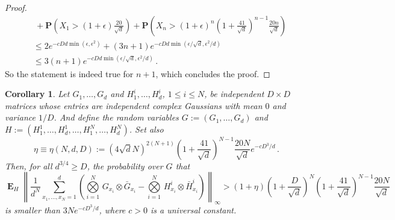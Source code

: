 \documentclass{amsart}
\newtheorem{corollary}[theorem]{Corollary}
\renewcommand{\P}{\mathbf{P}}
\renewcommand{\leq}{\leqslant}
\renewcommand{\geq}{\geqslant}
\DeclareMathOperator{\E}{\mathbf{E}}
\begin{document}
\begin{proof}
\begin{align*}
                                                                                                                     & \ + \P \left( X_1 > (1+\epsilon)\frac{20}{\sqrt{d}} \right) + \P \left( X_n > (1+\epsilon)^n\left(1+\frac{41}{\sqrt{d}}\right)^{n-1}\frac{20n}{\sqrt{d}} \right) \\
                                                                                                                     & \leq 2e^{-cDd\min(\epsilon,\epsilon^2)} + (3n+1)e^{-cDd\min(\epsilon/\sqrt{d},\epsilon^2/d)}                                                                     \\
                                                                                                                     & \leq 3(n+1)e^{-cDd\min(\epsilon/\sqrt{d},\epsilon^2/d)} \, .
    \end{align*}
    So the statement is indeed true for $n+1$, which concludes the proof.
\end{proof}

\begin{corollary} \label{cor:dev-norm-sym-n}
    Let $G_1,\ldots,G_d$ and $H_1^i,\ldots,H_d^i$, $1\leq i\leq N$, be independent $D\times D$ matrices whose entries are independent complex Gaussians with mean $0$ and variance $1/D$. And define the random variables $G:=(G_1,\ldots,G_d)$ and $H:=(H_1^1,\ldots,H_d^1,\ldots,H_1^N,\ldots,H_d^N)$. Set also
    \begin{equation} \label{def:eta}
        \eta\equiv \eta(N,d,D) := (4\sqrt{d}N)^{2(N+1)} \left(1+\frac{41}{\sqrt{d}}\right)^{N-1}\frac{20N}{\sqrt{d}} e^{-cD^3/d} \, .
    \end{equation}
    Then, for all $d^{3/4}\geq D$, the probability over $G$ that
    \[ \E_H \left\| \frac{1}{d^N}\sum_{x_1,\ldots,x_N=1}^d \left( \underset{i=1}{\overset{N}{\bigotimes}}\, G_{x_i}\otimes\bar{G}_{x_i} - \underset{i=1}{\overset{N}{\bigotimes}}\, H_{x_i}^i\otimes\bar{H}_{x_i}^i \right) \right\|_{\infty} > (1+\eta)\left(1+\frac{D}{\sqrt{d}}\right)^N \left(1+\frac{41}{\sqrt{d}}\right)^{N-1}\frac{20N}{\sqrt{d}} \]
    is smaller than $3Ne^{-cD^3/d}$, where $c>0$ is a universal constant.
\end{corollary}
\end{document}
